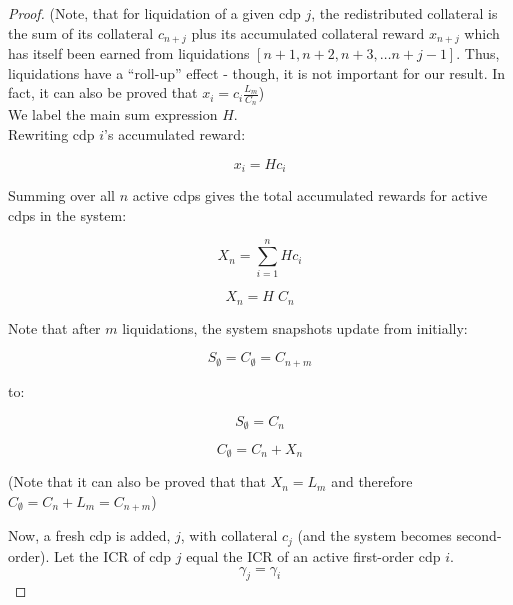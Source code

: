 \documentclass[reqno]{article}
\begin{document}
\begin{proof}
\bigskip
(Note, that for liquidation of a given cdp $j$, the redistributed collateral is the sum of its collateral $c_{n+j}$ plus its accumulated collateral reward $x_{n+j}$ which has itself been earned from liquidations $[n+1, n+2, n+3, … n+j-1]$.  Thus, liquidations have a “roll-up” effect - though, it is not important for our result. In fact, it can also be proved that $x_i=c_i\frac{L_m}{C_n}$)\\

We label the main sum expression $H$.\\

Rewriting cdp $i$’s accumulated reward:

\begin{equation} \label{eq:45}
    x_i=Hc_i
\end{equation}

\bigskip
Summing over all $n$ active cdps gives the total accumulated rewards for active cdps in the system:

\begin{equation} 
    X_n=\sum\limits^n_{i=1}Hc_i
\end{equation}

\begin{equation} \label{eq:47}
    X_n=H \; C_n
\end{equation}

\bigskip
Note that after $m$ liquidations, the system snapshots update from initially:

\begin{equation}
    S_\emptyset = C_\emptyset = C_{n+m}
\end{equation}

to:

\begin{equation} \label{eq:8}
    S_\emptyset=C_n
\end{equation}

\begin{equation} \label{eq:9}
    C_\emptyset=C_n+X_n
\end{equation}

\bigskip
(Note that it can also be proved that that $X_n=L_m$ and therefore $C_\emptyset=C_n+L_m=C_{n+m}$)

\bigskip
Now, a fresh cdp is added, $j$, with collateral $c_j$ (and the system becomes second-order). Let the ICR of cdp $j$ equal the ICR of an active first-order cdp $i$.\\

\begin{equation} \label{eq:10}
    \gamma_j=\gamma_i
\end{equation}


\end{proof}
\end{document}
